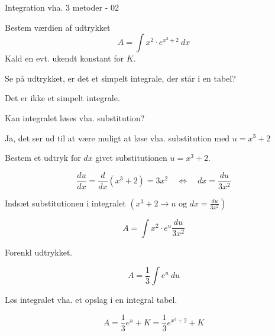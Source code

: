 \documentclass{article}
\begin{document}
\begin{exercise}{Integration vha. 3 metoder - 02}
	
	Bestem værdien af udtrykket
	\[
	A = \int x^2 \cdot e^{x^3+2} \ dx
	\]
	Kald en evt. ukendt konstant for $K$.
	
	
	\hint
	Se på udtrykket, er det et simpelt integrale, der står i en tabel?
	
	\hint
	Det er ikke et simpelt integrale.
	
	\hint
	Kan integralet løses vha. substitution?
	
	\hint
	Ja, det ser ud til at være muligt at løse vha. substitution med $u=x^3+2$
	
	\hint
	Bestem et udtryk for $dx$ givet substitutionen $u=x^3+2$.
	
	\hint
	\[
	\frac{du}{dx} = \frac{d}{dx} \left(x^3+2 \right) = 3x^2 \quad \Leftrightarrow \quad dx = \frac{du}{3x^2}
	\]
	
	\hint
	Indsæt substitutionen i integralet $\left(x^3+2 \rightarrow u \textrm{ og } dx = \frac{du}{3x^2} \right)$
	
	\hint
	\[
	A = \int x^2 \cdot e^{u} \frac{du}{3x^2} 
	\]
	
	\hint
	Forenkl udtrykket.
	
	\hint
	\[
	A =  \frac{1}{3} \int e^{u} \ du 
	\]
	
	\hint
	Løs integralet vha. et opslag i en integral tabel.
	
	\hint
	\[
	A = \frac{1}{3} e^{u} + K =  \frac{1}{3} e^{x^3+2} + K
	\]
	
	
\end{exercise}

\newpage
\end{document}
